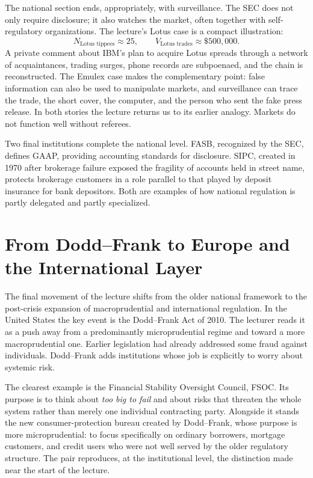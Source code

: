 The national section ends, appropriately, with surveillance. The SEC does not only require disclosure; it also watches the market, often together with self-regulatory organizations. The lecture's Lotus case is a compact illustration:
\begin{equation}
N_{\text{Lotus tippees}}\approx 25,
\qquad
V_{\text{Lotus trades}}\approx \$500{,}000.
\end{equation}
A private comment about IBM's plan to acquire Lotus spreads through a network of acquaintances, trading surges, phone records are subpoenaed, and the chain is reconstructed. The Emulex case makes the complementary point: false information can also be used to manipulate markets, and surveillance can trace the trade, the short cover, the computer, and the person who sent the fake press release. In both stories the lecture returns us to its earlier analogy. Markets do not function well without referees.

Two final institutions complete the national level. FASB, recognized by the SEC, defines GAAP, providing accounting standards for disclosure. SIPC, created in 1970 after brokerage failure exposed the fragility of accounts held in street name, protects brokerage customers in a role parallel to that played by deposit insurance for bank depositors. Both are examples of how national regulation is partly delegated and partly specialized.

\section{From Dodd--Frank to Europe and the International Layer}

The final movement of the lecture shifts from the older national framework to the post-crisis expansion of macroprudential and international regulation. In the United States the key event is the Dodd--Frank Act of 2010. The lecturer reads it as a push away from a predominantly microprudential regime and toward a more macroprudential one. Earlier legislation had already addressed some fraud against individuals. Dodd--Frank adds institutions whose job is explicitly to worry about systemic risk.

The clearest example is the Financial Stability Oversight Council, FSOC. Its purpose is to think about \emph{too big to fail} and about risks that threaten the whole system rather than merely one individual contracting party. Alongside it stands the new consumer-protection bureau created by Dodd--Frank, whose purpose is more microprudential: to focus specifically on ordinary borrowers, mortgage customers, and credit users who were not well served by the older regulatory structure. The pair reproduces, at the institutional level, the distinction made near the start of the lecture.

